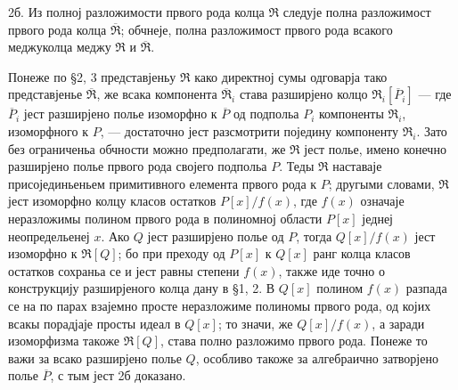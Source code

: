 \documentclass[11pt]{article}
\begin{document}
\setcounter{footnote}{22}

2б. Из полној разложимости првого рода колца $\mathfrak R$ следује полна разложимост првого рода колца $\overline{\mathfrak R}$; обчнеје, полна разложимост првого рода всакого меджуколца меджу $\mathfrak R$ и $\overline{\mathfrak R}$.

Понеже по \S 2, 3 представјеньу $\mathfrak R$ како директној сумы одговарја тако представјенье $\overline{\mathfrak R}$, же всака компонента $\overline{\mathfrak R}_i$ става разширјено колцо $\mathfrak R_i[\overline P_i]$ --- где $\overline P_i$ јест разширјено полье изоморфно к $\overline P$ од подпольа $P_i$ компоненты $\mathfrak R_i$, изоморфного к $P$, --- достаточно јест разсмотрити поједину компоненту $\mathfrak R_i$. Зато без ограниченьа обчности можно предполагати, же $\mathfrak R$ јест полье, имено конечно разширјено полье првого рода својего подпольа $P$. Теды $\mathfrak R$ наставаје присојединьеньем примитивного елемента првого рода к $P$; другыми словами, $\mathfrak R$ јест изоморфно колцу класов остатков $P[x]/f(x)$, где $f(x)$ означаје неразложимы полином првого рода в полиномној области $P[x]$ једнеј неопредельенеј $x$. Ако $Q$ јест разширјено полье од $P$, тогда $Q[x]/f(x)$ јест изоморфно к $\mathfrak R[Q]$; бо при преходу од $P[x]$ к $Q[x]$ ранг колца класов остатков сохраньа се и јест равны степени $f(x)$, также иде точно о конструкцију разширјеного колца дану в \S 1, 2. В $Q[x]$ полином $f(x)$ разпада се на по парах взајемно просте неразложиме полиномы првого рода, од којих всакы порадјаје просты идеал в $Q[x]$; то значи, же $Q[x]/f(x)$, а заради изоморфизма такоже $\mathfrak R[Q]$, става полно разложимо првого рода. Понеже то важи за всако разширјено полье $Q$, особливо такоже за алгебраично затворјено полье $\overline P$, с тым јест 2б доказано.
\end{document}
